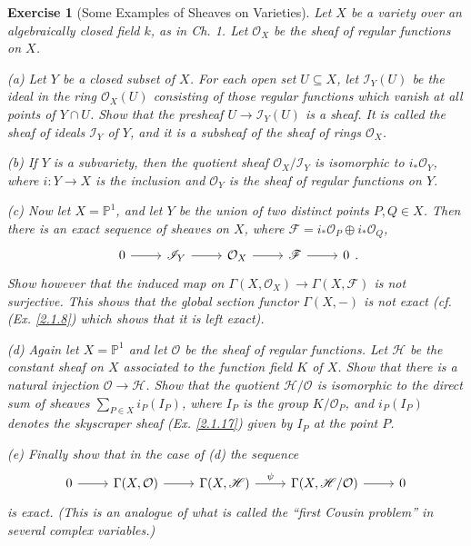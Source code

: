 \documentclass{amsart}
\newtheorem{exe}{Exercise}[subsection]
\begin{document}
\begin{exe}[Some Examples of Sheaves on Varieties]
	\label{2.1.21}
	Let $X$ be a variety over an algebraically closed field $k$, as in \textup{Ch. 1}. Let $\mathcal{O}_X$ be the sheaf of regular functions on $X$.
	
	(a) Let $Y$ be a closed subset of $X$. For each open set $U\subseteq X$, let $\mathscr{I}_Y(U)$ be the ideal in the ring $\mathcal{O}_X(U)$ consisting of those regular functions which vanish at all points of $Y\cap U$. Show that the presheaf $U\to\mathscr{I}_Y(U)$ is a sheaf. It is called the \textup{sheaf of ideals} $\mathscr{I}_Y$ of $Y$, and it is a subsheaf of the sheaf of rings $\mathcal{O}_X$.
	
	(b) If $Y$ is a subvariety, then the quotient sheaf $\mathcal{O}_X/\mathscr{I}_Y$ is isomorphic to $i_*\mathcal{O}_Y$, where $i:Y\to X$ is the inclusion and $\mathcal{O}_Y$ is the sheaf of regular functions on $Y$.
	
	(c) Now let $X=\mathbb{P}^1$, and let $Y$ be the union of two distinct points $P,Q\in X$. Then there is an exact sequence of sheaves on $X$, where $\mathscr{F}=i_*\mathcal{O}_P\oplus i_*\mathcal{O}_Q$,
	\begin{equation*}
		\begin{tikzcd}
			0 \arrow[r] & \mathscr{I}_Y \arrow[r] & \mathcal{O}_X \arrow[r] & \mathscr{F} \arrow[r] & 0
		\end{tikzcd}.
	\end{equation*}
	Show however that the induced map on $\Gamma(X,\mathcal{O}_X)\to\Gamma(X,\mathscr{F})$ is not surjective. This shows that the global section functor $\Gamma(X,-)$ is not exact \textup{(cf. (Ex. \ref{2.1.8}) which shows that it is left exact)}.
	
	(d) Again let $X=\mathbb{P}^1$ and let $\mathcal{O}$ be the sheaf of regular functions. Let $\mathscr{H}$ be the constant sheaf on $X$ associated to the function field $K$ of $X$. Show that there is a natural injection $\mathcal{O}\to\mathscr{H}$. Show that the quotient $\mathscr{H}/\mathcal{O}$ is isomorphic to the direct sum of sheaves $\sum_{P\in X}i_P(I_P)$, where $I_P$ is the group $K/\mathcal{O}_P$, and $i_P(I_P)$ denotes the skyscraper sheaf \textup{(Ex. \ref{2.1.17})} given by $I_P$ at the point $P$.
	
	(e) Finally show that in the case of (d) the sequence
	\begin{equation*}
		\begin{tikzcd}
			0 \arrow[r] & {\Gamma(X,\mathcal{O})} \arrow[r] & {\Gamma(X,\mathscr{H})} \arrow[r, "\psi"] & {\Gamma(X,\mathscr{H}/\mathcal{O})} \arrow[r] & 0
		\end{tikzcd}
	\end{equation*}
	is exact. \textup{(This is an analogue of what is called the ``first Cousin problem'' in several complex variables.)}
\end{exe}
\end{document}
